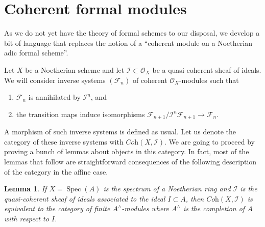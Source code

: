 \documentclass{stacks-project}
\theoremstyle{plain}
\newtheorem{lemma}[subsection]{Lemma}
\theoremstyle{definition}
\theoremstyle{remark}
\numberwithin{equation}{subsection}
\def\Spec{\mathop{\mathrm{Spec}}}
\begin{document}
\section{Coherent formal modules}
\label{section-coherent-formal}

\noindent
As we do not yet have the theory of formal schemes to our disposal, we
develop a bit of language that replaces the notion of a ``coherent module on a
Noetherian adic formal scheme''.

\medskip\noindent
Let $X$ be a Noetherian scheme and let $\mathcal{I} \subset \mathcal{O}_X$
be a quasi-coherent sheaf of ideals. We will consider inverse
systems $(\mathcal{F}_n)$ of coherent $\mathcal{O}_X$-modules such that
\begin{enumerate}
\item $\mathcal{F}_n$ is annihilated by $\mathcal{I}^n$, and
\item the transition maps induce isomorphisms
$\mathcal{F}_{n + 1}/\mathcal{I}^n\mathcal{F}_{n + 1} \to \mathcal{F}_n$.
\end{enumerate}
A morphism of such inverse systems is defined as usual.
Let us denote the category of these inverse systems with
$\textit{Coh}(X, \mathcal{I})$. We are going to proceed by proving
a bunch of lemmas about objects in this category. In fact, most
of the lemmas that follow are straightforward consequences of the following
description of the category in the affine case.

\begin{lemma}
\label{lemma-inverse-systems-affine}
If $X = \Spec(A)$ is the spectrum of a Noetherian ring and
$\mathcal{I}$ is the quasi-coherent sheaf of ideals associated to the ideal
$I \subset A$, then $\textit{Coh}(X, \mathcal{I})$ is equivalent to the
category of finite $A^\wedge$-modules where $A^\wedge$ is the completion
of $A$ with respect to $I$.
\end{lemma}
\end{document}
